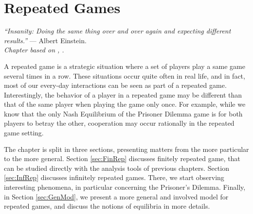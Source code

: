 \ifx \globalmark \undefined %
	
\else
\fi




\chapter{Repeated Games}
{\large{\itshape
``Insanity: Doing the same thing over and over again and expecting different results.''} --- Albert Einstein.\\
}
\label{chap:Rep}
{\small{\itshape
Chapter based on \cite[pages 308 - 331]{MyGTAO}, \cite[Section 6.1]{ShLeMSAG}.}\\
}

A repeated game is a strategic situation where a set of players play a same game several times in a row. These situations occur quite often in real life, and in fact, most of our every-day interactions can be seen as part of a repeated game.\\
Interestingly, the behavior of a player in a repeated game may be different than that of the same player when playing the game only once. For example, while we know that the only Nash Equilibrium of
the Prisoner Dilemma game is for both players to betray the other, cooperation may occur rationally in the repeated game setting.

The chapter is split in three sections, presenting matters from the more particular to the more general. Section \ref{sec:FinRep} discusses finitely repeated game, that can be studied directly with the analysis tools of previous chapters. Section \ref{sec:InfRep} discusses infinitely repeated games. There, we start observing interesting phenomena, in particular concerning the Prisoner's Dilemma. Finally, in Section \ref{sec:GenMod}, we present a more general and involved model for repeated games, and discuss the notions of equilibria in more details.

